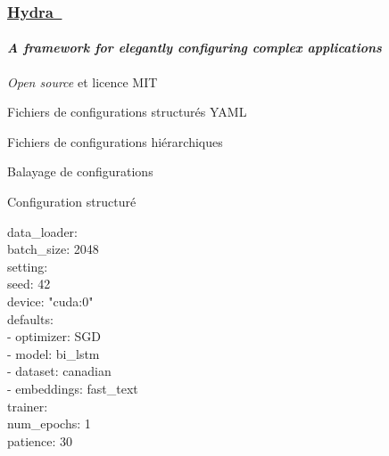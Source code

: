 \documentclass[aspectratio=169,10pt,xcolor=x11names,english,french]{beamer}
\makeatletter
\newenvironment{Scode}{%
	\def\FrameCommand##1{\hskip\@totalleftmargin
		\vrule width 3pt\colorbox{codebg}{\hspace{5pt}##1}%
		\hskip-\linewidth \hskip-\@totalleftmargin \hskip\columnwidth}%
	\MakeFramed {\advance\hsize-\width
		\@totalleftmargin\z@ \linewidth\hsize
		\advance\labelsep\fboxsep
		\@setminipage}%
}{\par\unskip\@minipagefalse\endMakeFramed}
\newcommand{\link}[2]{\href{#1}{#2~{\smaller\faExternalLink*}}}
\makeatother
\begin{document}
	\begin{frame}
		\frametitle{\link{https://hydra.cc/}{Hydra}}
		\framesubtitle{\textit{A framework for elegantly configuring complex applications}}
		
		\centering
		\begin{minipage}{0.24\linewidth}
				\centering
				\fontsize{35}{35}\vfil
				\vspace{1em}
				\normalsize \textit{Open source} et licence MIT
		\end{minipage}
		\begin{minipage}{0.24\linewidth}
				\centering
				\fontsize{35}{35}\faFile\vfil
				\vspace{1em}
				\normalsize Fichiers de configurations structurés YAML
		\end{minipage}
		\begin{minipage}{0.24\linewidth}
				\centering
				\fontsize{35}{35}\vfil
				\vspace{1em}
				\normalsize Fichiers de configurations hiérarchiques
		\end{minipage}
		\begin{minipage}{0.24\linewidth}
			\centering
			\fontsize{35}{35}\faCogs\vfil
			\vspace{1em}
			\normalsize Balayage de configurations
		\end{minipage}
		\note{
		}
	\end{frame}

	\begin{frame}{Configuration structuré}
		\begin{Scode}
			data\_loader: \\
			\quad	batch\_size: 2048 \\
			setting: \\
			\quad seed: 42 \\
			\quad device: "cuda:0" \\
			defaults: \\
			\quad - optimizer: SGD \\
			\quad - model: bi\_lstm \\
			\quad - dataset: canadian \\
			\quad - embeddings: fast\_text \\
			trainer: \\
			\quad num\_epochs: 1 \\
			\quad patience: 30 \\
		\end{Scode}
	\end{frame}
	
\end{document}
